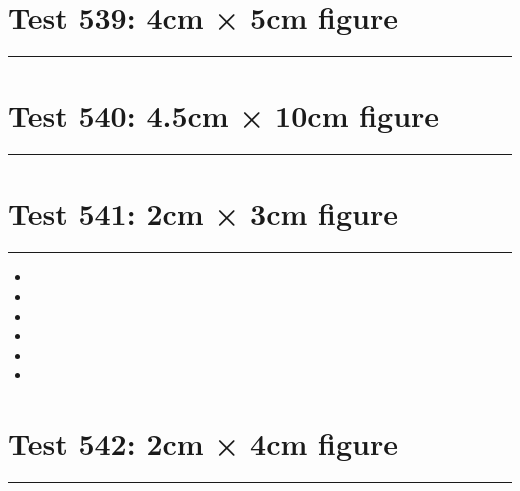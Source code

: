 \documentclass[a4paper,11pt]{article}
\begin{document}
\section*{Test 539: 4cm × 5cm figure}
\begin{swarmwrap}%
  \begin{minipage}[t]{4cm}
    \centering
    \rule{\linewidth}{5cm}
  \end{minipage}%
\end{swarmwrap}%
\swarmwrapnext
\lipsum[14]
\lipsum[15]
\lipsum[16]
\lipsum[17]
\section*{Test 540: 4.5cm × 10cm figure}
\begin{swarmwrap}%
  \begin{minipage}[t]{4cm}
    \centering
    \rule{\linewidth}{10cm}
  \end{minipage}%
\end{swarmwrap}%
\swarmwrapnext
\lipsum[61]
\lipsum[62]
\lipsum[63]
\lipsum[64]
\section*{Test 541: 2cm × 3cm figure}
\begin{swarmwrap}%
  \begin{minipage}[t]{2cm}
    \centering
    \rule{\linewidth}{3cm}
  \end{minipage}%
\end{swarmwrap}
\begin{itemize}
  \item \swarmwrapnext\lipsum[85][1-4]
  \item \lipsum[87][1-3]
  \item \lipsum[88][1-3]
  \item \lipsum[89][1-3]
  \item \lipsum[90][1-3]
  \item \lipsum[91][1-3]
\end{itemize}
\section*{Test 542: 2cm × 4cm figure}
\begin{swarmwrap}%
  \begin{minipage}[t]{2cm}
    \centering
    \rule{\linewidth}{4cm}
  \end{minipage}%
\end{swarmwrap}%
\swarmwrapnext
\lipsum[142]
\lipsum[143]
\lipsum[144]
\end{document}

